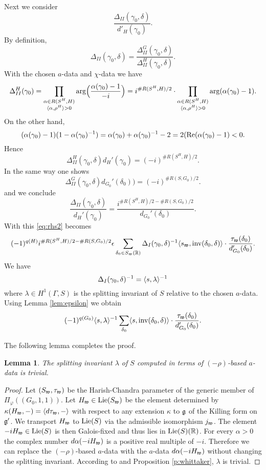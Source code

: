 \documentclass{article}
\newtheorem{lem}[thm]{Lemma}
\theoremstyle{definition}
\numberwithin{equation}{section}
\renewcommand{\-}{\hyp{}}
\begin{document}
Next we consider
\[ \frac{\Delta_{II}(\gamma_0,\delta)}{d'_H(\gamma_0)}.\]
By definition,
\[ \Delta_{II}(\gamma_0,\delta) = \frac{\Delta_{II}^G(\gamma_0,\delta)}{\Delta_{II}^H(\gamma_0,\delta)}.\]
With the chosen $a$-data and $\chi$-data we have
\[ \Delta_{II}^H(\gamma_0)=\prod\limits_{\substack{\alpha \in R(S^H,H)\\ \langle\alpha,\rho^H\rangle>0}}\textrm{arg}\Big(\frac{\alpha(\gamma_0)-1}{-i}\Big) = i^{\#R(S^H,H)/2}\cdot\prod\limits_{\substack{\alpha \in R(S^H,H)\\ \langle\alpha,\rho^H\rangle>0}}\textrm{arg}(\alpha(\gamma_0)-1). \]
On the other hand,
\[ (\alpha(\gamma_0)-1)(1-\alpha(\gamma_0)^{-1})=\alpha(\gamma_0)+\alpha(\gamma_0)^{-1}-2=2(\textrm{Re}(\alpha(\gamma_0)-1) < 0.\]
Hence
\[ \Delta_{II}^H(\gamma_0,\delta)d_H'(\gamma_0) = (-i)^{\#R(S^H,H)/2}. \]
In the same way one shows
\[ \Delta_{II}^G(\gamma_0,\delta)d_{G_0}'(\delta_0)) = (-i)^{\#R(S,G_0)/2}. \]
and we conclude
\[ \frac{\Delta_{II}(\gamma_0,\delta)}{d_H'(\gamma_0)} = \frac{i^{\#R(S^H,H)/2-\#R(S,G_0)/2}}{d_{G_0}'(\delta_0)}.\]
With this \eqref{eq:rhs2} becomes
\[ (-1)^{q(H)}i^{\#R(S^H,H)/2-\#R(S,G_0)/2}\epsilon \sum_{\delta_0 \in S_{\mathfrak{w}}(\mathbb{R})}\Delta_I(\gamma_0,\delta)^{-1} \langle s_{\mathfrak{w}},\textrm{inv}(\delta_0,\delta)\rangle \cdot\frac{\tau_{\mathfrak{w}}(\delta_0)}{d'_{G_0}(\delta_0)}. \]
We have
\[ \Delta_{I}(\gamma_0,\delta)^{-1} = \langle s,\lambda\rangle^{-1} \]
where $\lambda \in H^1(\Gamma,S)$ is the splitting invariant of $S$ relative to the chosen $a$-data. Using Lemma \ref{lem:epsilon} we obtain
\[(-1)^{q(G_0)}\langle s,\lambda\rangle^{-1}\sum_{\delta_0}\langle s,\textrm{inv}(\delta_0,\delta)\rangle\cdot\frac{\tau_{\mathfrak{w}}(\delta_0)}{d_{G_0}'(\delta_0)}. \]

The following lemma completes the proof.

\begin{lem} \label{lem:gen}
The splitting invariant $\lambda$ of $S$ computed in terms of $(-\rho)$-based $a$-data is trivial.
\end{lem}
\begin{proof}
Let $(S_{\mathfrak{w}},\tau_{\mathfrak{w}})$ be the Harish-Chandra parameter of the generic member of $\Pi_\varphi((G_0,1,1))$. Let $H_{\mathfrak{w}} \in \textrm{Lie}(S_{\mathfrak{w}})$ be the element determined by $\kappa(H_{\mathfrak{w}},-)=\langle d\tau_{\mathfrak{w}},-\rangle$ with respect to any extension $\kappa$ to $\mathfrak{g}$ of the Killing form on $\mathfrak{g}'$. We transport $H_{\mathfrak{w}}$ to $\textrm{Lie}(S)$ via the admissible isomorphism $j_{\mathfrak{w}}$. The element $-iH_{\mathfrak{w}} \in \textrm{Lie}(S)$ is then Galois-fixed and thus lies in $\textrm{Lie}(S)(\mathbb{R})$. For every $\alpha>0$ the complex number $d\alpha(-iH_{\mathfrak{w}})$ is a positive real multiple of $-i$. Therefore we can replace the $(-\rho)$-based $a$-data with the $a$-data $d\alpha(-iH_{\mathfrak{w}})$ without changing the splitting invariant. According to \cite[Theorem 5.1]{Kot99} and Proposition \ref{p:whittaker}, $\lambda$ is trivial.
\end{proof}





%

\end{document}
